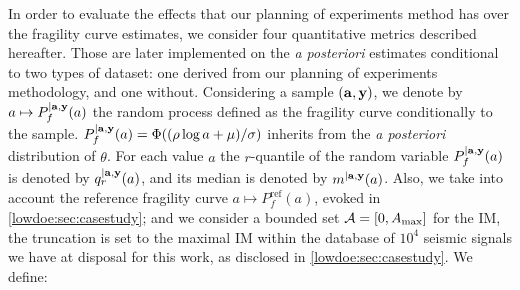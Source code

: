 In order to evaluate the effects that our planning of experiments method has over the fragility curve estimates, we consider four quantitative metrics described hereafter. Those are later implemented on the \emph{a posteriori} estimates conditional to two types of dataset: one derived from our planning of experiments methodology, and one without.
Considering a sample $(\mathbf{a}, \mathbf{y})$, we denote
by $a \mapsto P_f^{|\mathbf{a}, \mathbf{y}}(a)$ the random process defined as the fragility curve conditionally to the sample. $P_f^{|\mathbf{a},\mathbf{y}}(a)=\Phi((\rho\log a+\mu)/\sigma)$ inherits from the \emph{a posteriori} distribution of $\theta$.  
For each value $a$ the $r$-quantile of the random variable $P_f^{|\mathbf{a},\mathbf{y}}(a)$ is denoted by $q_r^{|\mathbf{a},\mathbf{y}}(a)$, and its median is denoted by $m^{|\mathbf{a},\mathbf{y}}(a)$.  
Also, we take into account the reference fragility curve $a\mapsto P_f^{\mathrm{ref}}(a)$, evoked in \cref{lowdoe:sec:casestudy}; and we consider a bounded set $\mathcal{A}=[0,A_{\max}]$ for the IM, the truncation is set to the maximal IM within the database of $10^4$ seismic signals we have at disposal for this work, as disclosed in \cref{lowdoe:sec:casestudy}. %
    We define:
